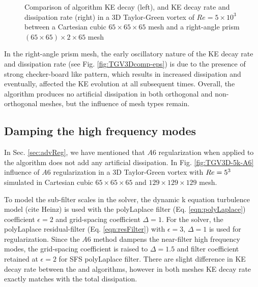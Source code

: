 \begin{figure}[!h]
\centering
{}
\caption{Comparison of \spaece algorithm KE decay (left), and KE decay rate and dissipation rate (right) in a 3D Taylor-Green vortex of $Re = 5\times10^3$ between a Cartesian cubic $65 \times 65 \times 65$ mesh and a right-angle prism $(65 \times 65) \times 2 \times 65$ mesh} 
\label{fig:TGV3Dcomp}
\end{figure}

In the right-angle prism mesh, the early oscillatory nature of the KE decay rate and dissipation rate (see Fig. \ref{fig:TGV3Dcomp-eps}) is due to the presence of strong checker-board like pattern, which results in increased dissipation and eventually, affected the KE evolution at all subsequent times. Overall, the \spaece algorithm produces no artificial dissipation in both orthogonal and non-orthogonal meshes, but the influence of mesh types remain.



\subsection{Damping the high frequency modes}
\label{sec:dampHFModes}

In Sec. \ref{sec:advReg}, we have mentioned that $A6$ regularization when applied to the \spaece algorithm does not add any artificial dissipation. In Fig. \ref{fig:TGV3D-5k-A6} influence of $A6$ regularization in a 3D Taylor-Green vortex with $Re = 5 \time 10^3$ simulated in Cartesian cubic $65 \times 65 \times 65$ and $129 \times 129 \times 129$ mesh.

To model the sub-filter scales in the \spaece solver, the dynamic k equation turbulence model (cite Heinz) is used with the polyLaplace filter (Eq. \eqref{eqn:polyLaplace}) coefficient $\epsilon = 2$ and grid-spacing coefficient $\Delta =1$.  For the \spaeceA solver, the polyLaplace residual-filter (Eq. \eqref{eqn:resFilter}) with $\epsilon = 3,\,\Delta =1$ is used for regularization. Since the $A6$ method dampens the near-filter high frequency modes, the grid-spacing coefficient is raised to $\Delta =1.5$ and filter coefficient retained at $\epsilon = 2$ for SFS polyLaplace filter. There are slight difference in KE decay rate between the \spaece and \spaeceA algorithms, however in both meshes KE decay rate exactly matches with the total dissipation.

